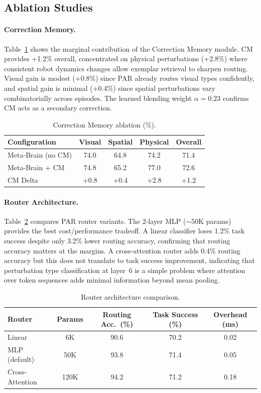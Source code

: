 \documentclass[letterpaper]{article}
\begin{document}
\subsection{Ablation Studies}

\paragraph{Correction Memory.}
Table~\ref{tab:cm-ablation} shows the marginal contribution of the Correction Memory module.
CM provides +1.2\% overall, concentrated on physical perturbations (+2.8\%) where consistent robot dynamics changes allow exemplar retrieval to sharpen routing.
Visual gain is modest (+0.8\%) since PAR already routes visual types confidently, and spatial gain is minimal (+0.4\%) since spatial perturbations vary combinatorially across episodes.
The learned blending weight $\alpha = 0.23$ confirms CM acts as a secondary correction.

\begin{table}[h]
\centering
\caption{Correction Memory ablation (\%).}
\label{tab:cm-ablation}
\small
\begin{tabular}{lcccc}
\toprule
Configuration & Visual & Spatial & Physical & Overall \\
\midrule
Meta-Brain (no CM) & 74.0 & 64.8 & 74.2 & 71.4 \\
Meta-Brain + CM    & 74.8 & 65.2 & 77.0 & 72.6 \\
CM Delta           & +0.8 & +0.4 & +2.8 & +1.2 \\
\bottomrule
\end{tabular}
\end{table}

\paragraph{Router Architecture.}
Table~\ref{tab:router-arch} compares PAR router variants.
The 2-layer MLP (${\sim}50$K params) provides the best cost/performance tradeoff.
A linear classifier loses 1.2\% task success despite only 3.2\% lower routing accuracy, confirming that routing accuracy matters at the margins.
A cross-attention router adds 0.4\% routing accuracy but this does not translate to task success improvement, indicating that perturbation type classification at layer~6 is a simple problem where attention over token sequences adds minimal information beyond mean pooling.

\begin{table}[h]
\centering
\caption{Router architecture comparison.}
\label{tab:router-arch}
\small
\begin{tabular}{lcccc}
\toprule
Router & Params & Routing Acc.\ (\%) & Task Success (\%) & Overhead (ms) \\
\midrule
Linear         & 6K   & 90.6 & 70.2 & 0.02 \\
MLP (default)  & 50K  & 93.8 & 71.4 & 0.05 \\
Cross-Attention & 120K & 94.2 & 71.2 & 0.18 \\
\bottomrule
\end{tabular}
\end{table}
\end{document}
